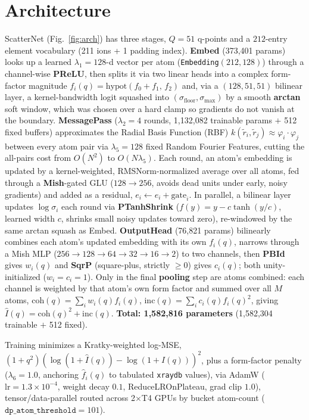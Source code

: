 \documentclass[final]{article}
\begin{document}
\section{Architecture}
ScatterNet (Fig.~\ref{fig:arch}) has three stages, $Q{=}51$ q-points and a
$212$-entry element vocabulary (211 ions + 1 padding index). \textbf{Embed}
(373,401 params) looks up a learned $\lambda_1{=}128$-d vector per atom
(\texttt{Embedding}$(212,128)$) through a channel-wise \textbf{PReLU}, then splits it
via two linear heads into a complex form-factor magnitude $f_i(q) =
\mathrm{hypot}(f_0{+}f_1,\,f_2)$ and, via a $(128,51,51)$ bilinear layer, 
a kernel-bandwidth logit squashed into  $(\sigma_{\mathrm{floor}},\sigma_{\max})$ 
by a smooth \textbf{arctan} soft window, which was chosen over a hard clamp so gradients 
do not vanish at the boundary. \textbf{MessagePass} ($\lambda_2{=}4$ rounds, 1,132,082 
trainable params $+$ 512 fixed buffers) approximates the Radial Basis Function (RBF)
$k(\tilde r_i,\tilde r_j){\approx}\varphi_i{\cdot}\varphi_j$ between every atom pair via
$\lambda_5{=}128$ fixed Random Fourier Features, cutting the all-pairs cost from
$O(N^2)$ to $O(N\lambda_5)$. Each round, an atom's embedding is updated by a
kernel-weighted, RMSNorm-normalized average over all atoms, fed through a 
\textbf{Mish}-gated GLU ($128{\to}256$, avoids dead units under early, noisy gradients) and added
as a residual, $e_i \leftarrow e_i + \mathrm{gate}_i$. In parallel, a bilinear
layer updates $\log\sigma_i$ each round via \textbf{PTanhShrink} ($f(y){=}y-c\tanh(y/c)$,
learned width $c$, shrinks small noisy updates toward zero), re-windowed by the same
arctan squash as Embed. \textbf{OutputHead} (76,821 params) bilinearly combines each
atom's updated embedding with its own $f_i(q)$, narrows through a Mish MLP
($256{\to}128{\to}64{\to}32{\to}16{\to}2$) to two channels, then
\textbf{PBId} gives $w_i(q)$ and \textbf{SqrP} (square-plus, strictly $\geq 0$) 
gives $c_i(q)$; both  unity-initialized ($w_i{=}c_i{=}1$). 
Only in the final \textbf{pooling} step are atoms
combined: each channel is weighted by that atom's own form factor and summed over all
$M$ atoms, $\mathrm{coh}(q){=}\sum_i w_i(q)f_i(q)$, $\mathrm{inc}(q){=}\sum_i
c_i(q)f_i(q)^2$, giving $\hat I(q) = \mathrm{coh}(q)^2 + \mathrm{inc}(q)$. \textbf{Total: 1,582,816
parameters} (1,582,304 trainable $+$ 512 fixed).

Training minimizes a Kratky-weighted log-MSE, $(1+q^2)(\log(1{+}\hat I(q)) -
\log(1{+}I(q)))^2$, plus a form-factor penalty ($\lambda_6{=}1.0$, anchoring
$\hat f_i(q)$ to tabulated \texttt{xraydb} values), via AdamW
($\mathrm{lr}=1.3\times10^{-4}$, weight decay $0.1$, ReduceLROnPlateau, grad clip $1.0$),
tensor/data-parallel routed across 2$\times$T4 GPUs by bucket atom-count
($\mathtt{dp\_atom\_threshold}{=}101$).
\end{document}
